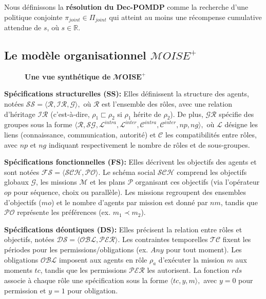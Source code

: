 \documentclass[francais,ROIA,Unicode,manuscript]{cedram}
\begin{document}
Nous définissons la \textbf{résolution du Dec-POMDP} comme la recherche d'une politique conjointe \(\pi_{joint} \in \Pi_{joint}\) qui atteint au moins une récompense cumulative attendue de \(s\), où \(s \in \mathbb{R}\).

\subsection{Le modèle organisationnel \(\mathcal{M}OISE^+\)}

\begin{figure}[h!]
    
    \caption{\textbf{Une vue synthétique de} $\mathbfcal{M}\mathbf{OISE^+}$}
    \label{fig:moise_model}
\end{figure}

\noindent \textbf{Spécifications structurelles (SS):}
Elles définissent la structure des agents, notées
$
    \mathcal{SS} = \langle \mathcal{R}, \mathcal{IR}, \mathcal{G} \rangle,
$
où \(\mathcal{R}\) est l'ensemble des rôles, avec une relation d'héritage \(\mathcal{IR}\) (c'est-à-dire, \(\rho_1 \sqsubset \rho_2\) si \(\rho_1\) hérite de \(\rho_2\)). De plus, \(\mathcal{GR}\) spécifie des groupes sous la forme
$
    \langle \mathcal{R}, \mathcal{SG}, \mathcal{L}^{intra}, \mathcal{L}^{inter}, \mathcal{C}^{intra}, \mathcal{C}^{inter}, np, ng \rangle,
$
où \(\mathcal{L}\) désigne les liens (connaissance, communication, autorité) et \(\mathcal{C}\) les compatibilités entre rôles, avec \(np\) et \(ng\) indiquant respectivement le nombre de rôles et de sous-groupes.

\vspace{0.5em}
\noindent \textbf{Spécifications fonctionnelles (FS):}
Elles décrivent les objectifs des agents et sont notées
$
    \mathcal{FS} = \langle \mathcal{SCH}, \mathcal{PO} \rangle.
$
Le schéma social \(\mathcal{SCH}\) comprend les objectifs globaux \(\mathcal{G}\), les missions \(\mathcal{M}\) et les plans \(\mathcal{P}\) organisant ces objectifs (via l'opérateur \(op\) pour séquence, choix ou parallèle). Les missions regroupent des ensembles d'objectifs (\(mo\)) et le nombre d'agents par mission est donné par \(nm\), tandis que \(\mathcal{PO}\) représente les préférences (ex. \(m_1 \prec m_2\)).

\vspace{0.5em}
\noindent \textbf{Spécifications déontiques (DS):}
Elles précisent la relation entre rôles et objectifs, notées
$
    \mathcal{DS} = \langle \mathcal{OBL}, \mathcal{PER} \rangle.
$
Les contraintes temporelles \(\mathcal{TC}\) fixent les périodes pour les permissions/obligations (ex. \(Any\) pour tout moment). Les obligations \(\mathcal{OBL}\) imposent aux agents en rôle \(\rho_a\) d'exécuter la mission \(m\) aux moments \(tc\), tandis que les permissions \(\mathcal{PER}\) les autorisent. La fonction \(rds\) associe à chaque rôle une spécification sous la forme
$
    \langle tc, y, m \rangle,
$
avec \(y=0\) pour permission et \(y=1\) pour obligation.
\end{document}
